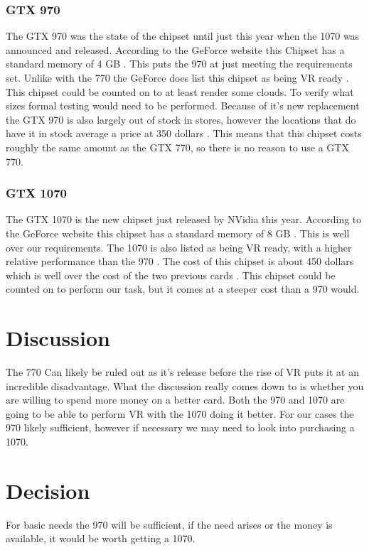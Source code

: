 \documentclass{article}
\begin{document}
\subsubsection{GTX 970}
The GTX 970 was the state of the chipset until just this year when the 1070 was announced and released.
According to the GeForce website this Chipset has a standard memory of 4 GB \cite{geforce}.
This puts the 970 at just meeting the requirements set.
Unlike with the 770 the GeForce does list this chipset as being VR ready \cite{geforce}.
This chipset could be counted on to at least render some clouds.
To verify what sizes formal testing would need to be performed.
Because of it's new replacement the GTX 970 is also largely out of stock in stores, however the locations that do have it in stock average a price at 350 dollars \cite{geforce}.
This means that this chipset costs roughly the same amount as the GTX 770, so there is no reason to use a GTX 770.

\subsubsection{GTX 1070}
The GTX 1070 is the new chipset just released by NVidia this year.
According to the GeForce website this chipset has a standard memory of 8 GB \cite{geforce}.
This is well over our requirements.
The 1070 is also listed as being VR ready, with a higher relative performance than the 970 \cite{geforce}.
The cost of this chipset is about 450 dollars which is well over the cost of the two previous cards \cite{geforce}.
This chipset could be counted on to perform our task, but it comes at a steeper cost than a 970 would.

\section{Discussion}
The 770 Can likely be ruled out as it's release before the rise of VR puts it at an incredible disadvantage.
What the discussion really comes down to is whether you are willing to spend more money on a better card.
Both the 970 and 1070 are going to be able to perform VR with the 1070 doing it better.
For our cases the 970 likely sufficient, however if necessary we may need to look into purchasing a 1070.

\section{Decision}
For basic needs the 970 will be sufficient, if the need arises or the money is available, it would be worth getting a 1070.
\end{document}
